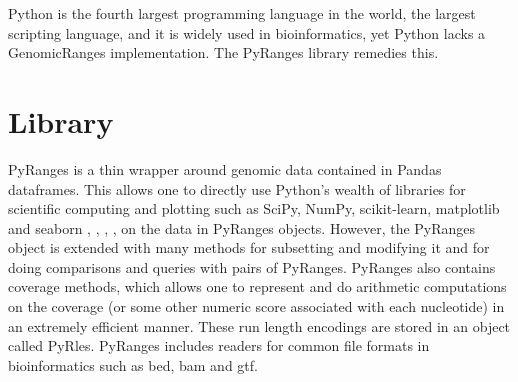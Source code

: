 \documentclass[10pt,letterpaper]{article}
\begin{document}
Python is the fourth largest programming language in the world, the largest
scripting language, and it is widely used in bioinformatics, yet Python lacks a
GenomicRanges implementation. The PyRanges library remedies this.

\section*{Library}

PyRanges is a thin wrapper around genomic data contained in Pandas
\cite{mckinney-proc-scipy-2010} dataframes. This allows one to directly use
Python's wealth of libraries for scientific computing and plotting such as
SciPy, NumPy, scikit-learn, matplotlib and seaborn \cite{scipy},
\cite{oliphant-2006-guide}, \cite{scikit-learn}, \cite{Hunter:2007},
\cite{michael_waskom_2017_883859} on the data in PyRanges objects. However, the
PyRanges object is extended with many methods for subsetting and modifying it
and for doing comparisons and queries with pairs of PyRanges. PyRanges also
contains coverage methods, which allows one to represent and do arithmetic
computations on the coverage (or some other numeric score associated with each
nucleotide) in an extremely efficient manner. These run length encodings are
stored in an object called PyRles. PyRanges includes readers for common
file formats in bioinformatics such as bed, bam and gtf.
\end{document}
